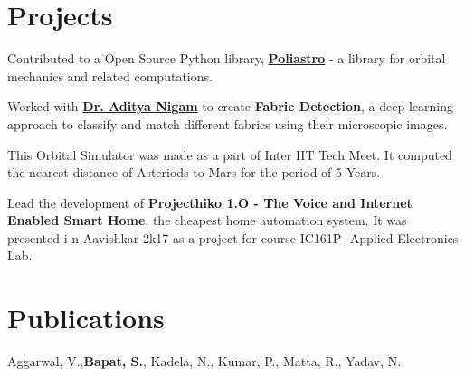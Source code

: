\documentclass[]{deedy-resume-openfont}
\begin{document}
\begin{minipage}[t]{0.66\textwidth}

\section{Projects}
Contributed to a Open Source Python library, \textbf{\href{http://github.com/poliastro/poliastro}{Poliastro}} - a library for orbital mechanics and related computations.
\sectionsep

Worked with \textbf{\href{http://faculty.iitmandi.ac.in/~aditya/}{Dr. Aditya Nigam}} to create \textbf{Fabric Detection}, a deep learning approach to classify and match different fabrics using their microscopic images. 
\sectionsep

This Orbital Simulator was made as a part of Inter IIT Tech Meet. It computed the nearest distance of Asteriods to Mars for the period of 5 Years. 
\sectionsep


Lead the development of \textbf{Projecthiko 1.O - The Voice and Internet Enabled Smart Home}, the cheapest home automation system. It was presented i n Aavishkar 2k17 as a project for course IC161P- Applied Electronics Lab.
\sectionsep



\section{Publications}

Aggarwal, V.,\textbf{Bapat, S.}, Kadela, N., Kumar, P., Matta, R., Yadav, N.
\sectionsep




\end{minipage}
\end{document}
